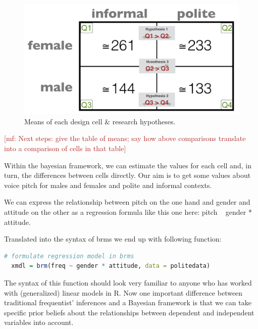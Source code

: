 \documentclass[nobib]{tufte-handout}
\renewcommand{\mf}[1]{\textcolor{firebrick}{[mf: #1]}}
\begin{document}
\begin{figure}[h]
  \centering
    \includegraphics[width = \textwidth]{pics/table_mean_hypotheses.png}
    \caption{Means of each design cell \& research hypotheses.}
    \label{fig:BasicPlotData_table}
\end{figure}

\mf{Next steps: give the table of means; say how above comparisons translate into a comparison of cells in that table}

Within the bayesian framework, we can estimate the values for each cell and, in turn, the differences between cells directly. Our aim is to get some values about voice pitch for males and females and polite and informal contexts. 

We can express the relationship between pitch on the one hand and gender and attitude on the other as a regression formula like this one here: pitch ~ gender * attitude.

Translated into the syntax of brms we end up with following function:

\medskip

\begin{lstlisting}[language=R]
  # formulate regression model in brms
  xmdl = brm(freq ~ gender * attitude, data = politedata)
\end{lstlisting}

\vspace*{-0.5cm}

\noindent 

The syntax of this function should look very familiar to anyone who has worked with (generalized) linear models in R. Now one important difference between traditional frequentist' inferences and a Bayesian framework is that we can take specific prior beliefs about the relationships between dependent and independent variables into account. 
\end{document}
